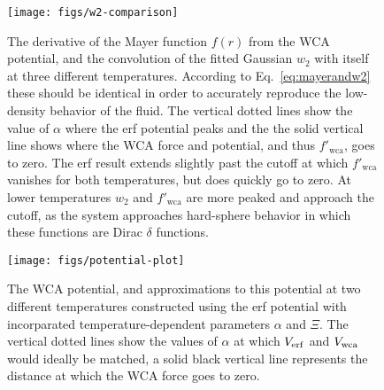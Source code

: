 \documentclass[letterpaper,twocolumn,amsmath,amssymb,prb]{revtex4-1}
\begin{document}
\begin{figure}
\begin{center}
\texttt{[image: figs/w2-comparison]}
\end{center}
\caption{The derivative of the Mayer function $f(r)$ from the WCA
  potential, and the convolution of the fitted Gaussian $w_2$ with
  itself at three different temperatures. According to
  Eq.~\ref{eq:mayerandw2} these should be identical in order to
  accurately reproduce the low-density behavior of the fluid.
  The vertical dotted lines
  show the value of $\alpha$ where the erf potential peaks and
  the the solid vertical line shows where the WCA force and potential,
  and thus $f'_{\mathrm{wca}}$, goes to zero. 
  The erf result extends slightly past the cutoff at which 
  $f'_{\mathrm{wca}}$ vanishes for
  both temperatures, but does quickly go to zero. 
  At lower temperatures $w_2$ and $f'_{\mathrm{wca}}$ are more 
  peaked and approach the cutoff, as
  the system approaches hard-sphere behavior in which these functions
  are Dirac $\delta$ functions. }
\label{fig:w2-comparison}
\end{figure}

\begin{figure}
\begin{center}
\texttt{[image: figs/potential-plot]}
\end{center}
\caption{The WCA potential, 
   and approximations to this potential
   at two different temperatures constructed using the erf potential 
   with incorparated temperature-dependent parameters $\alpha$ and $\Xi$. 
   The vertical dotted lines show the values of $\alpha$ at
   which $V_{\mathrm{erf}}$ and $V_{\mathrm{wca}}$ would ideally be matched, a solid black vertical 
   line represents the distance at which the WCA force goes to zero. }
\label{fig:potential-plot}
\end{figure}
\end{document}
